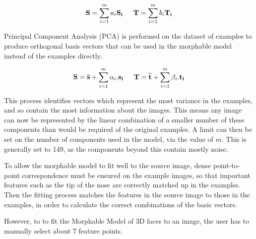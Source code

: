 \documentclass[11pt,a4paper]{report}
\begin{document}
\begin{equation}
\mathbf{S} = \sum_{i=1}^ma_i \mathbf{S_i} \indent \mathbf{T} = \sum_{i=1}^mb_i \mathbf{T_i}
\end{equation}

Principal Component Analysis (PCA) is performed on the dataset of examples
to produce orthogonal basis vectors that can be used in the morphable
model instead of the examples directly.

\begin{equation}
\mathbf{S} = \mathbf{\bar{s}} + \sum_{i=1}^m\alpha_i.\mathbf{s_i} \indent \mathbf{T} = \mathbf{\bar{t}} + \sum_{i=1}^m\beta_i.\mathbf{t_i}
\end{equation}

This process identifies vectors which represent the most variance in
the examples, and so contain the most information about
the images. This means any image can now be represented by the linear
combination of a smaller number of these components than would be
required of the original examples. A limit can then be set on the number
of components used in the model, via the value of $m$. This
is generally set to 149, as the components beyond this contain
mostly noise.


To allow the morphable model to fit well to the source image, dense
point-to-point correspondence must be ensured on the example
images, so that important features such as the tip of the nose are
correctly matched up in the examples. Then the fitting process matches
the features in the source image to those in the examples, in order to
calculate the correct combinations of the basis vectors.


However, to to fit the Morphable Model of 3D faces to an image, the user has to manually select
about 7 feature points.
\end{document}
